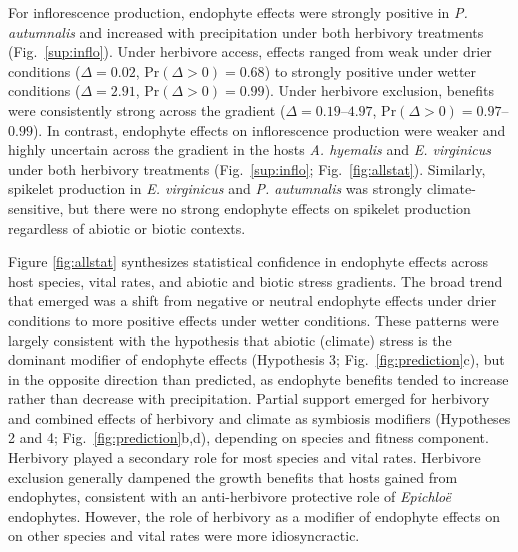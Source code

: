 \documentclass[12pt]{article}\usepackage[]{graphicx}\usepackage[dvipsnames]{xcolor}
\begin{document}
For inflorescence production, endophyte effects were strongly positive in \textit{P. autumnalis} and increased with precipitation under both herbivory treatments (Fig.~\ref{sup:inflo}). 
Under herbivore access, effects ranged from weak under drier conditions ($\Delta = 0.02$, $\mathrm{Pr}(\Delta > 0) = 0.68$) to strongly positive under wetter conditions ($\Delta = 2.91$, $\mathrm{Pr}(\Delta > 0) = 0.99$). 
Under herbivore exclusion, benefits were consistently strong across the gradient ($\Delta = 0.19$--$4.97$, $\mathrm{Pr}(\Delta > 0) = 0.97$--$0.99$). 
In contrast, endophyte effects on inflorescence production were weaker and highly uncertain across the gradient in the hosts \textit{A. hyemalis} and \textit{E. virginicus} under both herbivory treatments (Fig.~\ref{sup:inflo}; Fig.~\ref{fig:allstat}). 
Similarly, spikelet production in \textit{E. virginicus} and \textit{P. autumnalis} was strongly climate-sensitive, but there were no strong endophyte effects on spikelet production regardless of abiotic or biotic contexts. 


Figure \ref{fig:allstat} synthesizes statistical confidence in endophyte effects across host species, vital rates, and abiotic and biotic stress gradients. 
The broad trend that emerged was a shift from negative or neutral endophyte effects under drier conditions to more positive effects under wetter conditions.
These patterns were largely consistent with the hypothesis that abiotic (climate) stress is the dominant modifier of endophyte effects (Hypothesis 3; Fig.~\ref{fig:prediction}c), but in the opposite direction than predicted, as endophyte benefits tended to increase rather than decrease with precipitation. 
Partial support emerged for herbivory and combined effects of herbivory and climate as symbiosis modifiers (Hypotheses 2 and 4; Fig.~\ref{fig:prediction}b,d), depending on species and fitness component. 
Herbivory played a secondary role for most species and vital rates. 
Herbivore exclusion generally dampened the growth benefits that hosts gained from endophytes, consistent with an anti-herbivore protective role of \textit{Epichloë} endophytes. 
However, the role of herbivory as a modifier of endophyte effects on on other species and vital rates were more idiosyncractic. 
\end{document}
